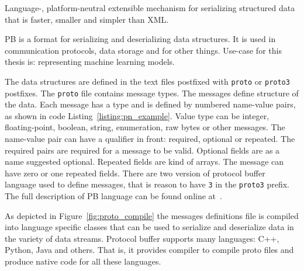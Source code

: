 \documentclass[english, 12pt, a4paper, elec, utf8, online]{aaltothesis}
\begin{document}
\begin{center}
Language-, platform-neutral extensible mechanism for serializing structured data that is faster, smaller and simpler than XML.
\end{center}

PB is a format for serializing and deserializing data structures. It is used in communication protocols, data storage and for other things. Use-case for this thesis is: representing machine learning models. 

The data structures are defined in the text files postfixed with \texttt{proto} or \texttt{proto3} postfixes. The \texttt{proto} file contains message types. The messages define structure of the data. Each message has a type and is defined by numbered name-value pairs, as shown in code Listing~\ref{listing:pn_example}. Value type can be integer, floating-point, boolean, string, enumeration, raw bytes or other messages. The name-value pair can have a qualifier in front: required, optional or repeated. The required pairs are required for a message to be valid. Optional fields are as a name suggested optional. Repeated fields are kind of arrays. The message can have zero or one repeated fields. There are two version of protocol buffer language used to define messages, that is reason to have \texttt{3} in the \texttt{proto3} prefix. The full description of PB language can be found online at~\cite{pb_reference}. 



As depicted in Figure~\ref{fig:proto_compile} the messages definitions file is compiled into language specific classes that can be used to serialize and deserialize data in the variety of data streams. Protocol buffer supports many languages: C++, Python, Java and others. That is, it provides compiler to compile proto files and produce native code for all these languages.
\end{document}
